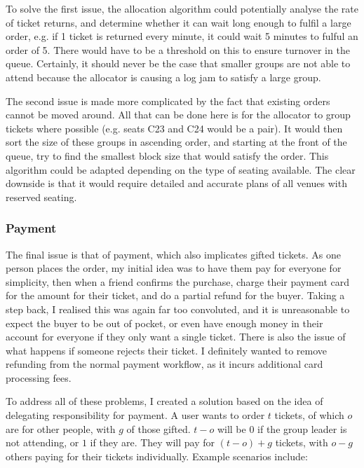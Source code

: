 \documentclass[12pt,a4]{bhamdissertation}
\begin{document}
To solve the first issue, the allocation algorithm could potentially analyse the rate of ticket returns, and determine whether it can wait long enough to fulfil a large order, e.g. if 1 ticket is returned every minute, it could wait 5 minutes to fulful an order of 5. There would have to be a threshold on this to ensure turnover in the queue. Certainly, it should never be the case that smaller groups are not able to attend because the allocator is causing a log jam to satisfy a large group.

The second issue is made more complicated by the fact that existing orders cannot be moved around. All that can be done here is for the allocator to group tickets where possible (e.g. seats C23 and C24 would be a pair). It would then sort the size of these groups in ascending order, and starting at the front of the queue, try to find the smallest block size that would satisfy the order. This algorithm could be adapted depending on the type of seating available. The clear downside is that it would require detailed and accurate plans of all venues with reserved seating.

\subsubsection{Payment}

The final issue is that of payment, which also implicates gifted tickets. As one person places the order, my initial idea was to have them pay for everyone for simplicity, then when a friend confirms the purchase, charge their payment card for the amount for their ticket, and do a partial refund for the buyer. Taking a step back, I realised this was again far too convoluted, and it is unreasonable to expect the buyer to be out of pocket, or even have enough money in their account for everyone if they only want a single ticket. There is also the issue of what happens if someone rejects their ticket. I definitely wanted to remove refunding from the normal payment workflow, as it incurs additional card processing fees.

To address all of these problems, I created a solution based on the idea of delegating responsibility for payment. A user wants to order $t$ tickets, of which $o$ are for other people, with $g$ of those gifted. $t - o$ will be $0$ if the group leader is not attending, or $1$ if they are. They will pay for $(t - o) + g$ tickets, with $o - g$ others paying for their tickets individually. Example scenarios include:
\end{document}
